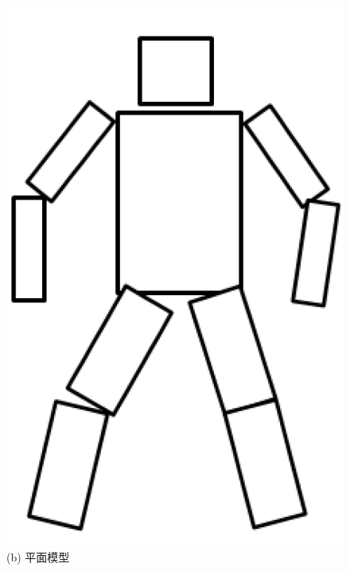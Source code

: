 \begin{figure}[!ht]
\begin{minipage}{.33\textwidth}
       \includegraphics[width=.95\linewidth]{figure/ch2_fig_personal_volumetric_model.png}
       \caption*{(b) 平面模型}
    \end{minipage}%
    \begin{minipage}{.33\textwidth}
      \centering

\end{minipage}
\end{figure}

